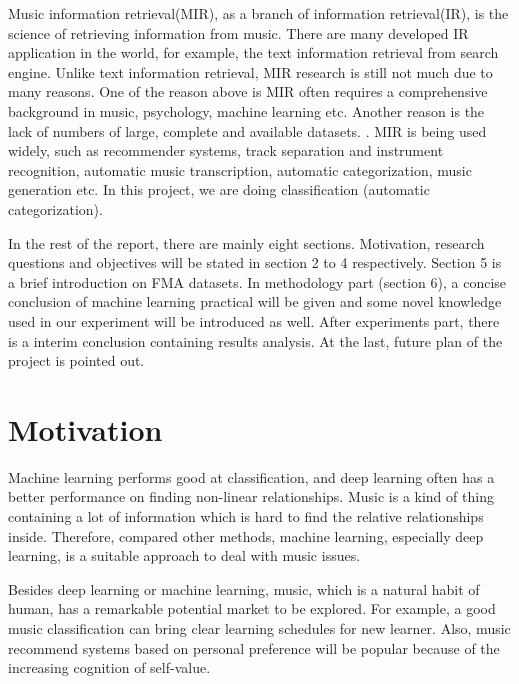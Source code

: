 \documentclass{article}
\begin{document}
Music information retrieval(MIR), as a branch of information retrieval(IR), is the science of retrieving information from music. There are many developed IR application in the world, for example, the text information retrieval from search engine. Unlike text information retrieval, MIR research is still not much due to many reasons. One of the reason above is MIR often requires a comprehensive background in music, psychology, machine learning etc. Another reason is the lack of numbers of large, complete and available datasets. \cite{fma}. MIR is being used widely, such as recommender systems, track separation and instrument recognition, automatic music transcription, automatic categorization, music generation etc. In this project, we are doing classification (automatic categorization).

In the rest of the report, there are mainly eight sections. Motivation, research questions and objectives will be stated in section 2 to 4 respectively. Section 5 is  a brief introduction on FMA datasets. In methodology part (section 6), a concise conclusion of machine learning practical will be given and some novel knowledge used in our experiment will be introduced as well.  After experiments part, there is  a interim conclusion containing results analysis. At the last, future plan of the project is pointed out.

\section{Motivation}
Machine learning performs good at classification, and deep learning often has a better performance on finding non-linear relationships. Music is a kind of thing containing a lot of information which is hard to find the relative relationships inside. Therefore, compared other methods, machine learning, especially deep learning, is a suitable approach to deal with music issues. 

Besides deep learning or machine learning, music, which is a natural habit of human, has a remarkable potential market to be explored. For example, a good music classification can bring clear learning schedules for new learner. Also, music recommend systems based on personal preference will be popular because of the increasing cognition of self-value. 
\end{document}
